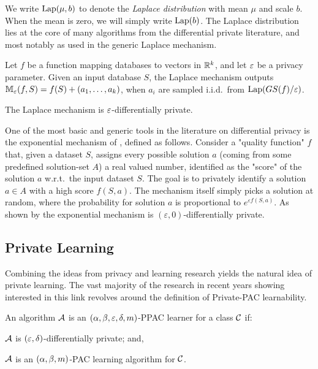 \documentclass[12pt,a4paper,oneside,onecolumn]{book}
\begin{document}
We write $\mathrm{Lap}(\mu,b)$ to denote the \emph{Laplace distribution} 
with mean $\mu$ and scale $b$. When the mean is zero, we will simply write $\mathrm{Lap}(b)$. The Laplace distribution lies at the core of many algorithms from the differential private literature, and most notably as used in the generic Laplace mechanism.
\begin{definition}
Let $f$ be a function mapping databases to vectors in $\mathbb{R}^k$, and let $\varepsilon$ be a privacy parameter.
Given an input database $S$, the Laplace mechanism outputs 
$\mathbb{M}_\varepsilon(f,S) = f(S) + (a_1,\ldots,a_k)$,
when $a_i$ are sampled i.i.d.\ from $\mathrm{Lap}(GS(f)/\varepsilon)$.
\end{definition}

\begin{theorem}
\label{thm:lap}
The Laplace mechanism is $\varepsilon$-differentially private.
\end{theorem}

One of the most basic and generic tools in the literature on differential privacy is the exponential mechanism of \citet{mcsherry2007mechanism}, defined as follows. Consider a "quality function" $f$ that, given a dataset $S$, assigns every possible solution $a$ (coming from some predefined solution-set $A$) a real valued number, identified as the "score" of the solution $a$ w.r.t.\ the input dataset $S$. The goal is to privately identify a solution $a\in A$ with a high score $f(S,a)$. The mechanism itself simply picks a solution at random, where the probability for solution $a$ is proportional to $e^{\varepsilon f(S,a)}$. As shown by \citet{mcsherry2007mechanism} the exponential mechanism is $(\varepsilon,0)$-differentially private.

\subsection{Private Learning}


Combining the ideas from privacy and learning research yields the natural idea of private learning.
The vast majority of the research in recent years showing interested in this link 
revolves around the definition of Private-PAC learnability.
\begin{definition}
An algorithm $\mathcal{A}$ is an $(\alpha,\beta,\varepsilon,\delta,m)$-PPAC learner for a class $\mathcal{C}$ 
if: 
\begin{enumerate*}[label=(\roman*)]
    \item $\mathcal{A}$ is $(\varepsilon,\delta)$-differentially private; and,
    \item $\mathcal{A}$ is an $(\alpha,\beta,m)$-PAC learning algorithm for $\mathcal{C}$.
\end{enumerate*}
\end{definition}
\end{document}
